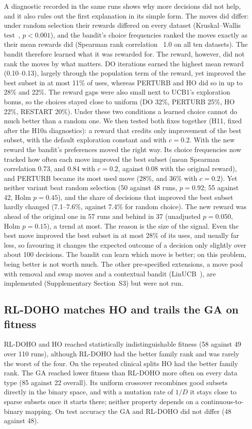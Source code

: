 \documentclass[journal]{IEEEtran}
\begin{document}
A diagnostic recorded in the same runs shows why more decisions did not help, and it also rules out the first explanation in its simple form. The moves did differ: under random selection their rewards differed on every dataset (Kruskal--Wallis test~\cite{kruskal1952}, $p<0.001$), and the bandit's choice frequencies ranked the moves exactly as their mean rewards did (Spearman rank correlation~\cite{spearman1904} 1.0 on all ten datasets). The bandit therefore learned what it was rewarded for. The reward, however, did not rank the moves by what matters. DO iterations earned the highest mean reward (0.10--0.13), largely through the population term of the reward, yet improved the best subset in at most 11\% of uses, whereas PERTURB and HO did so in up to 28\% and 22\%. The reward gaps were also small next to UCB1's exploration bonus, so the choices stayed close to uniform (DO 32\%, PERTURB 25\%, HO 22\%, RESTART 20\%). Under these two conditions a learned choice cannot do much better than a random one. We then tested both fixes together (H11, fixed after the H10a diagnostics): a reward that credits only improvement of the best subset, with the default exploration constant and with $c=0.2$. With the new reward the bandit's preferences moved the right way. Its choice frequencies now tracked how often each move improved the best subset (mean Spearman correlation 0.73, and 0.84 with $c=0.2$, against 0.08 with the original reward), and PERTURB became its most used move (28\%, and 36\% with $c=0.2$). Yet neither variant beat random selection (50 against 48 runs, $p=0.92$; 55 against 42, Holm $p=0.45$), and the share of decisions that improved the best subset hardly changed (7.1--7.6\%, against 7.4\% for random choice). The new reward was ahead of the original one in 57 runs and behind in 37 (unadjusted $p=0.050$, Holm $p=0.15$), a trend at most. The reason is the size of the signal. Even the best move improved the best subset in at most 28\% of its uses, and usually far less, so favouring it changes the expected outcome of a decision only slightly over about 100 decisions. The bandit can learn which move is better; on this problem, being better is not worth much. The other pre-specified extensions, a move pool with removal and swap moves and a contextual bandit (LinUCB~\cite{li2010linucb}), are implemented (Supplementary Section~S3) but were not run.

\subsection{RL-DOHO matches HO and trails the GA on fitness}
RL-DOHO and HO reached statistically indistinguishable fitness (58 against 49 over 110 runs), although RL-DOHO had the better family rank and was rarely the worst of the four. On the repeated clinical splits HO had the better family rank. The GA reached lower fitness than RL-DOHO more often on every data type (85 against 22 overall). Its uniform crossover recombines good subsets directly in the binary space, and with a mutation rate of $1/D$ it stays close to sparse subsets once it starts there; neither property depends on a continuous-to-binary mapping. On test accuracy the GA and RL-DOHO did not differ (48 against 48).
\end{document}
